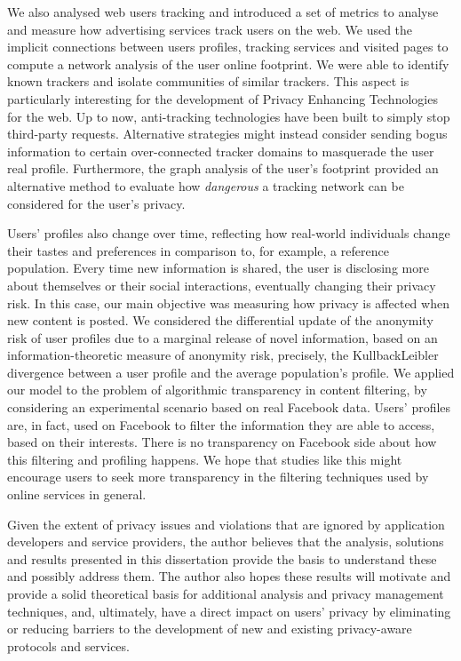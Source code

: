 We also analysed web users tracking and introduced a set of metrics to analyse and measure how advertising services track users on the web. We used the implicit connections between users profiles, tracking services and visited pages to compute a network analysis of the user online footprint. We were able to identify known trackers and isolate communities of similar trackers. This aspect is particularly interesting for the development of Privacy Enhancing Technologies for the web. Up to now, anti-tracking technologies have been built to simply stop third-party requests. Alternative strategies might instead consider sending bogus information to certain over-connected tracker domains to masquerade the user real profile. Furthermore, the graph analysis of the user's footprint provided an alternative method to evaluate how \emph{dangerous} a tracking network can be considered for the user's privacy.

Users' profiles also change over time, reflecting how real-world individuals change their tastes and preferences in comparison to, for example, a reference population. Every time new information is shared, the user is disclosing more about themselves or their social interactions, eventually changing their privacy risk. In this case, our main objective was measuring how privacy is affected when new content is posted. We considered the differential update of the anonymity risk of user profiles due to a marginal release of novel information, based on an information-theoretic measure of anonymity risk, precisely, the Kullback\hyph Leibler divergence between a user profile and the average population's profile.
We applied our model to the problem of algorithmic transparency in content filtering, by considering an experimental scenario based on real Facebook data. Users' profiles are, in fact, used on Facebook to filter the information they are able to access, based on their interests. There is no transparency on Facebook side about how this filtering and profiling happens. We hope that studies like this might encourage users to seek more transparency in the filtering techniques used by online services in general.

Given the extent of privacy issues and violations that are ignored by application developers and service providers, the author believes that the analysis, solutions and results presented in this dissertation provide the basis to understand these and possibly address them.
The author also hopes these results will motivate and provide a solid theoretical basis for additional analysis and privacy management techniques, and, ultimately, have a direct impact on users' privacy by eliminating or reducing barriers to the development of new and existing privacy-aware protocols and services.

